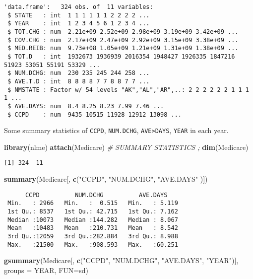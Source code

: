 \documentclass[]{book}
\newenvironment{Shaded}{\begin{snugshade}}{\end{snugshade}}
\newcommand{\CommentTok}[1]{\textcolor[rgb]{0.56,0.35,0.01}{\textit{#1}}}
\newcommand{\DataTypeTok}[1]{\textcolor[rgb]{0.13,0.29,0.53}{#1}}
\newcommand{\KeywordTok}[1]{\textcolor[rgb]{0.13,0.29,0.53}{\textbf{#1}}}
\newcommand{\NormalTok}[1]{#1}
\newcommand{\StringTok}[1]{\textcolor[rgb]{0.31,0.60,0.02}{#1}}
\begin{document}
\begin{verbatim}
'data.frame':   324 obs. of  11 variables:
 $ STATE   : int  1 1 1 1 1 1 2 2 2 2 ...
 $ YEAR    : int  1 2 3 4 5 6 1 2 3 4 ...
 $ TOT.CHG : num  2.21e+09 2.52e+09 2.98e+09 3.19e+09 3.42e+09 ...
 $ COV.CHG : num  2.17e+09 2.47e+09 2.92e+09 3.15e+09 3.38e+09 ...
 $ MED.REIB: num  9.73e+08 1.05e+09 1.21e+09 1.31e+09 1.38e+09 ...
 $ TOT.D   : int  1932673 1936939 2016354 1948427 1926335 1847216 51923 53051 55191 53329 ...
 $ NUM.DCHG: num  230 235 245 244 258 ...
 $ AVE.T.D : int  8 8 8 8 7 7 8 8 7 7 ...
 $ NMSTATE : Factor w/ 54 levels "AK","AL","AR",..: 2 2 2 2 2 2 1 1 1 1 ...
 $ AVE.DAYS: num  8.4 8.25 8.23 7.99 7.46 ...
 $ CCPD    : num  9435 10515 11928 12912 13098 ...
\end{verbatim}

Some summary statistics of \texttt{CCPD}, \texttt{NUM.DCHG}, \texttt{AVE\textgreater{}DAYS}, \texttt{YEAR} in each year.

\begin{Shaded}
\begin{Highlighting}[]
\KeywordTok{library}\NormalTok{(nlme)}
\KeywordTok{attach}\NormalTok{(Medicare)}
\CommentTok{#  SUMMARY STATISTICS ;}
\KeywordTok{dim}\NormalTok{(Medicare)}
\end{Highlighting}
\end{Shaded}

\begin{verbatim}
[1] 324  11
\end{verbatim}

\begin{Shaded}
\begin{Highlighting}[]
\KeywordTok{summary}\NormalTok{(Medicare[, }\KeywordTok{c}\NormalTok{(}\StringTok{"CCPD"}\NormalTok{, }\StringTok{"NUM.DCHG"}\NormalTok{, }\StringTok{"AVE.DAYS"}\NormalTok{ )])}
\end{Highlighting}
\end{Shaded}

\begin{verbatim}
      CCPD          NUM.DCHG          AVE.DAYS     
 Min.   : 2966   Min.   :  0.515   Min.   : 5.119  
 1st Qu.: 8537   1st Qu.: 42.715   1st Qu.: 7.162  
 Median :10073   Median :144.282   Median : 8.067  
 Mean   :10483   Mean   :210.731   Mean   : 8.542  
 3rd Qu.:12059   3rd Qu.:282.884   3rd Qu.: 8.988  
 Max.   :21500   Max.   :908.593   Max.   :60.251  
\end{verbatim}

\begin{Shaded}
\begin{Highlighting}[]
\KeywordTok{gsummary}\NormalTok{(Medicare[, }\KeywordTok{c}\NormalTok{(}\StringTok{"CCPD"}\NormalTok{, }\StringTok{"NUM.DCHG"}\NormalTok{, }\StringTok{"AVE.DAYS"}\NormalTok{, }\StringTok{"YEAR"}\NormalTok{)], }\DataTypeTok{groups =}\NormalTok{ YEAR, }\DataTypeTok{FUN=}\NormalTok{sd)}
\end{Highlighting}
\end{Shaded}
\end{document}
